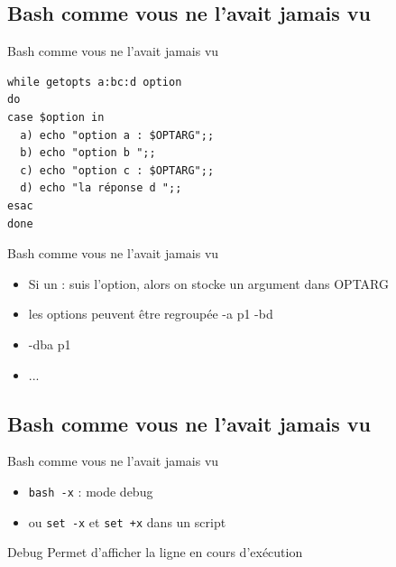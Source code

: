 \def\subsectitle{Bash comme vous ne l'avait jamais vu}
\subsection{\subsectitle}
\begin{frame}[containsverbatim]{\sectitle}
\begin{block}{\subsectitle}
\begin{verbatim}
while getopts a:bc:d option
do
case $option in
  a) echo "option a : $OPTARG";;
  b) echo "option b ";;
  c) echo "option c : $OPTARG";;  
  d) echo "la réponse d ";;  
esac
done
\end{verbatim}%

\end{block}
\end{frame}

\begin{frame}{\sectitle}
\begin{block}{\subsectitle}
\begin{itemize}
\item Si un : suis l'option, alors on stocke un argument dans OPTARG
\item les options peuvent être regroupée -a p1 -bd
\item -dba p1
\item ...
\end{itemize}
\end{block}
\end{frame}

\def\subsectitle{Bash comme vous ne l'avait jamais vu}
\subsection{\subsectitle}
\begin{frame}[containsverbatim]{\sectitle}
\begin{block}{\subsectitle}
\begin{itemize}
\item \verb!bash -x! : mode debug
\item ou \verb!set -x! et \verb!set +x! dans un script
\end{itemize}


\end{block}


\begin{block}{Debug}
Permet d'afficher la ligne en cours d'exécution
\end{block}

\end{frame}


